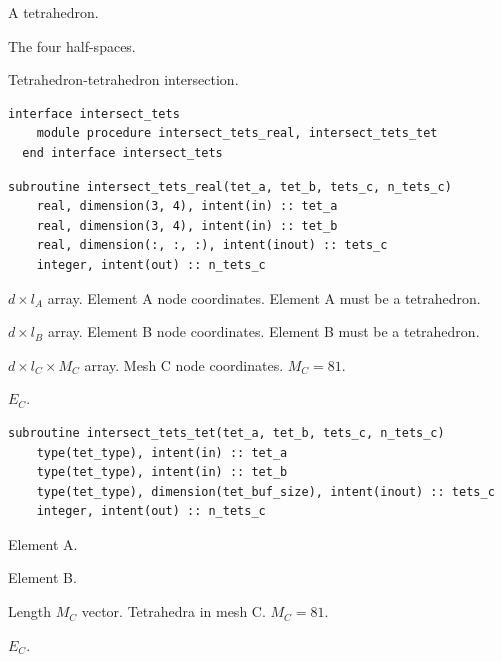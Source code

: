 \documentclass{article}
\begin{document}
\begin{description}[font=\ttfamily\bfseries,leftmargin=2.2\parindent,labelindent=1.7\parindent,noitemsep]
  \item[tet] A tetrahedron.
  \item[plane] The four half-spaces.
\end{description}

\noindent Tetrahedron-tetrahedron intersection.

\begin{lstlisting}[language=FORTRAN]
  interface intersect_tets
    module procedure intersect_tets_real, intersect_tets_tet
  end interface intersect_tets
\end{lstlisting}

\begin{lstlisting}[language=FORTRAN]
  subroutine intersect_tets_real(tet_a, tet_b, tets_c, n_tets_c)
    real, dimension(3, 4), intent(in) :: tet_a
    real, dimension(3, 4), intent(in) :: tet_b
    real, dimension(:, :, :), intent(inout) :: tets_c
    integer, intent(out) :: n_tets_c
\end{lstlisting}

\begin{description}[font=\ttfamily\bfseries,leftmargin=2.2\parindent,labelindent=1.7\parindent,noitemsep]
  \item[tet\_a] $d \times l_A$ array. Element A node coordinates. Element A must
    be a tetrahedron.
  \item[tet\_b] $d \times l_B$ array. Element B node coordinates. Element B must
    be a tetrahedron.
  \item[tets\_c] $d \times l_C \times M_C$ array. Mesh C node coordinates.
    $M_C = 81$.
  \item[n\_tets\_c] $E_C$.
\end{description}

\begin{lstlisting}[language=FORTRAN]
  subroutine intersect_tets_tet(tet_a, tet_b, tets_c, n_tets_c)
    type(tet_type), intent(in) :: tet_a
    type(tet_type), intent(in) :: tet_b
    type(tet_type), dimension(tet_buf_size), intent(inout) :: tets_c
    integer, intent(out) :: n_tets_c
\end{lstlisting}

\begin{description}[font=\ttfamily\bfseries,leftmargin=2.2\parindent,labelindent=1.7\parindent,noitemsep]
  \item[tet\_a] Element A.
  \item[tet\_b] Element B.
  \item[tets\_c] Length $M_C$ vector. Tetrahedra in mesh C. $M_C = 81$.
  \item[n\_tets\_c] $E_C$.
\end{description}
\end{document}

